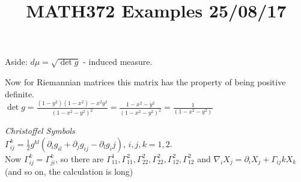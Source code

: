 \documentclass[11pt]{article}
\title{MATH372 Examples	 25/08/17}
\author{}
\date{}
\theoremstyle{thm}
\newcommand{\vpi}[0]{\medskip \par \noindent}
\begin{document}
Aside: $d \mu = \sqrt{\det{g}}$ - induced measure.\\
\vpi
Now for Riemannian matrices this matrix has the property of being positive definite.\\[1em]
$\det{g}=\displaystyle\frac{(1-y^2)(1-x^2)-x^2 y^2}{(1-x^2-y^2)^2}=\displaystyle\frac{1-x^2-y^2}{(1-x^2-y^2)^2}=\displaystyle\frac{1}{(1-x^2-y^2)}$\\
\vpi
\textit{Christoffel Symbols}\\
$\Gamma_{ij}^k = \displaystyle\frac{1}{2}g^{kl}(\partial_i g_{il}+\partial_j g_{ij} - \partial_l g_ij)$, $i,j,k = 1,2.$\\[1em]
Now $\Gamma_{ij}^{k}=\Gamma_{ji}^{k}$, so there are $\Gamma_{11}^{1}, \Gamma_{11}^{2}, \Gamma_{22}^{2}, \Gamma_{22}^{2}, \Gamma_{12}^{2}, \Gamma_{12}^{2}$ and
$\nabla_i X_j = \partial_i X_j + \Gamma_{ij}{k}X_k$\\
(and so on, the calculation is long)
\end{document}
